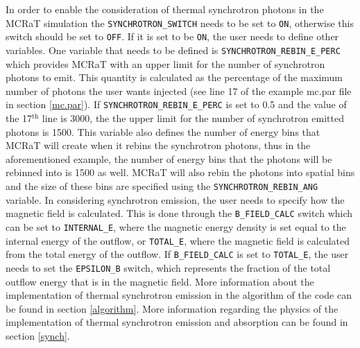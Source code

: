 \documentclass[12pt,a4paper]{article}
\begin{document}
In order to enable the consideration of thermal synchrotron photons in the MCRaT simulation the \texttt{SYNCHROTRON\_SWITCH} needs to be set to \texttt{ON}, otherwise this switch should be set to \texttt{OFF}. If it is set to be \texttt{ON}, the user needs to define other variables. One variable that needs to be defined is \texttt{SYNCHROTRON\_REBIN\_E\_PERC} which provides MCRaT with an upper limit for the number of synchrotron photons to emit. This quantity is calculated as the percentage of the maximum number of photons the user wants injected (see line 17 of the example mc.par file in section \ref{mc.par}). If \texttt{SYNCHROTRON\_REBIN\_E\_PERC} is set to 0.5 and the value of the 17$^\textrm{th}$ line is 3000, the the upper limit for the number of synchrotron emitted photons is 1500. This variable also defines the number of energy bins that MCRaT will create when it rebins the synchrotron photons, thus in the aforementioned example, the number of energy bins that the photons will be rebinned into is 1500 as well. MCRaT will also rebin the photons into spatial bins and the size of these bins are specified using the \texttt{SYNCHROTRON\_REBIN\_ANG} variable. In considering synchrotron emission, the user needs to specify how the magnetic field is calculated. This is done through the \texttt{B\_FIELD\_CALC} switch which can be set to \texttt{INTERNAL\_E}, where the magnetic energy density is set equal to the internal energy of the outflow, or \texttt{TOTAL\_E}, where the magnetic field is calculated from the total energy of the outflow. If \texttt{B\_FIELD\_CALC} is set to \texttt{TOTAL\_E}, the user needs to set the \texttt{EPSILON\_B} switch, which represents the fraction of the total outflow energy that is in the magnetic field. More information about the implementation of thermal synchrotron emission in the algorithm of the code can be found in section \ref{algorithm}. More information regarding the physics of the implementation of thermal synchrotron emission and absorption can be found in section \ref{synch}. 
\end{document}
